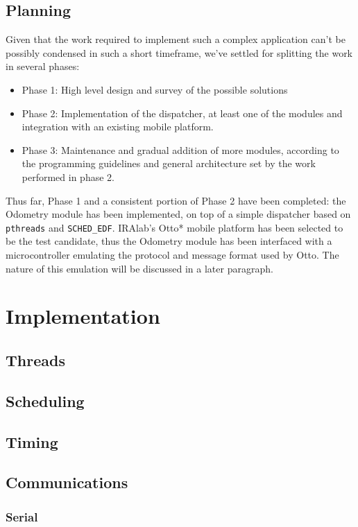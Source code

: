 \documentclass[a4paper,12pt]{report}
\begin{document}
\subsection{Planning}

Given that the work required to implement such a complex application can't be possibly condensed in such a short timeframe, we've settled for splitting the work in several phases:
\begin{itemize}
\item Phase 1: High level design and survey of the possible solutions
\item Phase 2: Implementation of the dispatcher, at least one of the
  modules and integration with an existing mobile platform. 
\item Phase 3: Maintenance and gradual addition of more modules,
  according to the programming guidelines and general architecture set
  by the work performed in phase 2. 
\end{itemize}

Thus far, Phase 1 and a consistent portion of Phase 2 have been completed: the Odometry module has been implemented, on top of a simple dispatcher based on \texttt{pthreads} and \texttt{SCHED\_EDF}. IRAlab's Otto* mobile platform has been selected to be the test candidate, thus the Odometry module has been interfaced with a microcontroller emulating the protocol and message format used by Otto. The nature of this emulation will be discussed in a later paragraph. %

\section{Implementation}
\subsection{Threads}
\subsection{Scheduling}
\subsection{Timing}
\subsection{Communications}
\subsubsection{Serial}
\end{document}
